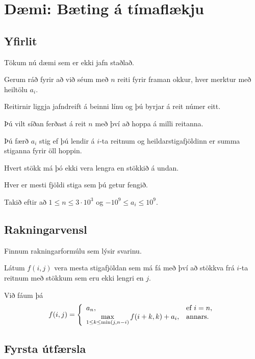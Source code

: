 \section{Dæmi: Bæting á tímaflækju}
\subsection{Yfirlit}
{
    {
        \item<1-> Tökum nú dæmi sem er ekki jafn staðlað.
        \item<2-> Gerum ráð fyrir að við séum með $n$ reiti fyrir framan okkur, hver merktur með heiltölu $a_i$.
        \item<3-> Reitirnir liggja jafndreift á beinni línu og þú byrjar á reit númer eitt.
        \item<4-> Þú vilt síðan ferðast á reit $n$ með því að hoppa á milli reitanna.
        \item<5-> Þú færð $a_i$ stig ef þú lendir á $i$-ta reitnum og heildarstigafjöldinn er summa stiganna fyrir öll hoppin.
        \item<6-> Hvert stökk má þó ekki vera lengra en stökkið á undan.
        \item<7-> Hver er mesti fjöldi stiga sem þú getur fengið.
        \item<8-> Takið eftir að $1 \leq n \leq 3 \cdot 10^3$ og $-10^9 \leq a_i \leq 10^9$.
    }
}

\subsection{Rakningarvensl}
{
    {
        \item<1-> Finnum rakningarformúlu sem lýsir svarinu.
        \item<2-> Látum $f(i, j)$ vera mesta stigafjöldan sem má fá með því að stökkva frá $i$-ta reitnum með stökkum sem eru ekki lengri en $j$.
        \item<3-> Við fáum þá
        \[
            f(i, j) = 
            \left \{
            \env{array}
            {
                {l l}
                a_n, & \text{ef $i = n$},\\
                \max\limits_{1 \leq k \leq \min(j, n - i)} f(i + k, k) + a_i, & \text{annars}.
            }
            \right .
        \]
    }
}

\subsection{Fyrsta útfærsla}
{
}

